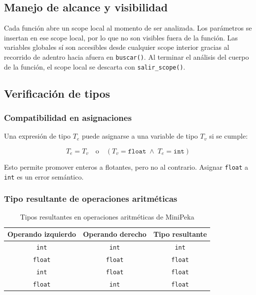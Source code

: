 \documentclass[12pt]{article}
\begin{document}
\subsection{Manejo de alcance y visibilidad}

Cada función abre un scope local al momento de ser analizada.
Los parámetros se insertan en ese scope local, por lo que no son
visibles fuera de la función. Las variables globales sí son
accesibles desde cualquier scope interior gracias al recorrido
de adentro hacia afuera en \texttt{buscar()}. Al terminar el
análisis del cuerpo de la función, el scope local se descarta
con \texttt{salir\_scope()}.

\subsection{Verificación de tipos}

\subsubsection{Compatibilidad en asignaciones}

Una expresión de tipo $T_e$ puede asignarse a una variable de
tipo $T_v$ si se cumple:

\[
T_e = T_v \quad \text{o} \quad
(T_v = \texttt{float} \;\land\; T_e = \texttt{int})
\]

Esto permite promover enteros a flotantes, pero no al contrario.
Asignar \texttt{float} a \texttt{int} es un error semántico.

\subsubsection{Tipo resultante de operaciones aritméticas}

\begin{table}[H]
\centering
\renewcommand{\arraystretch}{1.2}
\begin{tabular}{@{}ccc@{}}
\toprule
\textbf{Operando izquierdo} & \textbf{Operando derecho}
    & \textbf{Tipo resultante} \\
\midrule
\texttt{int}   & \texttt{int}   & \texttt{int}   \\
\texttt{float} & \texttt{float} & \texttt{float} \\
\texttt{int}   & \texttt{float} & \texttt{float} \\
\texttt{float} & \texttt{int}   & \texttt{float} \\
\bottomrule
\end{tabular}
\caption{Tipos resultantes en operaciones aritméticas de MiniPeka}
\end{table}
\end{document}
